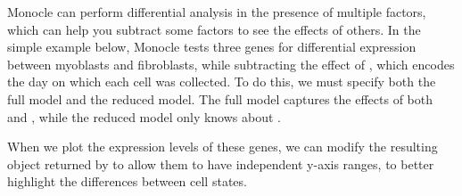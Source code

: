 \documentclass[10pt,oneside]{article}\usepackage[]{graphicx}\usepackage[]{color}
\begin{document}
Monocle can perform differential analysis in the presence of multiple factors, which can help you subtract some factors to see the effects of others.  In the simple example below, Monocle tests three genes for differential expression between myoblasts and fibroblasts, while subtracting the effect of , which encodes the day on which each cell was collected. To do this, we must specify both the full model and the reduced model. The full model captures the effects of both  and , while the reduced model only knows about .  

When we plot the expression levels of these genes, we can modify the resulting object returned by  to allow them to have independent y-axis ranges, to better highlight the differences between cell states.
\end{document}
